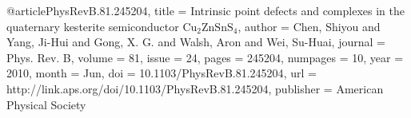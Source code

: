 @article{PhysRevB.81.245204,
  title = {Intrinsic point defects and complexes in the quaternary kesterite semiconductor ${\text{Cu}}_{2}{\text{ZnSnS}}_{4}$},
  author = {Chen, Shiyou and Yang, Ji-Hui and Gong, X. G. and Walsh, Aron and Wei, Su-Huai},
  journal = {Phys. Rev. B},
  volume = {81},
  issue = {24},
  pages = {245204},
  numpages = {10},
  year = {2010},
  month = {Jun},
  doi = {10.1103/PhysRevB.81.245204},
  url = {http://link.aps.org/doi/10.1103/PhysRevB.81.245204},
  publisher = {American Physical Society}
}
